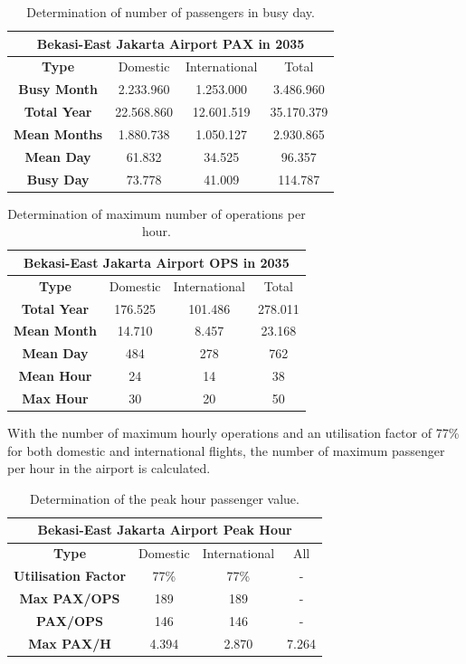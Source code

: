 \begin{table}[H]
	\label{table:'BusyDayPAX'}
	\centering
	\begin{tabular}{|c|c|c|c|}
		\hline 
		\multicolumn{4}{|c|}{\textbf{Bekasi-East Jakarta Airport PAX in 2035}}\tabularnewline
		\hline 
		\textbf{Type} & Domestic & International & Total\tabularnewline
		\hline 
		\textbf{Busy Month} & 2.233.960  & 1.253.000  & 3.486.960 \tabularnewline
		\hline 
		\textbf{Total Year} & 22.568.860  & 12.601.519  & 35.170.379 \tabularnewline
		\hline 
		\textbf{Mean Months} & 1.880.738  & 1.050.127  & 2.930.865 \tabularnewline
		\hline 
		\textbf{Mean Day} & 61.832  & 34.525  & 96.357 \tabularnewline
		\hline 
		\textbf{Busy Day} & 73.778  & 41.009  & 114.787 \tabularnewline
		\hline 
	\end{tabular}
	\caption{Determination of number of passengers in busy day.}
\end{table}

\begin{table}[H]
	\label{table:'BusyDayOPS'}
	\centering
	\begin{tabular}{|c|c|c|c|}
		\hline 
		\multicolumn{4}{|c|}{\textbf{Bekasi-East Jakarta Airport OPS in 2035}}\tabularnewline
		\hline 
		\textbf{Type} & Domestic & International & Total\tabularnewline
		\hline 
		\textbf{Total Year} & 176.525  & 101.486  & 278.011 \tabularnewline
		\hline 
		\textbf{Mean Month} & 14.710  & 8.457  & 23.168 \tabularnewline
		\hline 
		\textbf{Mean Day} & 484  & 278  & 762 \tabularnewline
		\hline 
		\textbf{Mean Hour} & 24  & 14  & 38 \tabularnewline
		\hline 
		\textbf{Max Hour} & 30  & 20  & 50 \tabularnewline
		\hline 
	\end{tabular}
	\caption{Determination of maximum number of operations per hour.}
\end{table}

With the number of maximum hourly operations and an utilisation factor of 77\% for both domestic and international flights, the number of maximum passenger per hour in the airport is calculated.

\begin{table}[H]
	\label{table:'PAXperhour'}
	\centering
\begin{tabular}{|c|c|c|c|}
	\hline 
	\multicolumn{4}{|c|}{\textbf{Bekasi-East Jakarta Airport Peak Hour}}\tabularnewline
	\hline 
	\textbf{Type} & Domestic & International & All\tabularnewline
	\hline 
	\textbf{Utilisation Factor} & 77\% & 77\% & -\tabularnewline
	\hline 
	\textbf{Max PAX/OPS} & 189 & 189 & -\tabularnewline
	\hline 
	\textbf{PAX/OPS} & 146 & 146 & -\tabularnewline
	\hline 
	\textbf{Max PAX/H} & 4.394 & 2.870 & 7.264\tabularnewline
	\hline 
\end{tabular}
\caption{Determination of the peak hour passenger value.}
\end{table}

	
	